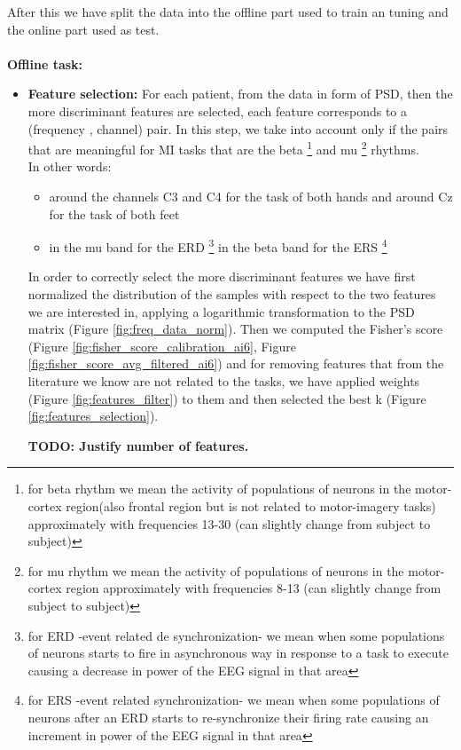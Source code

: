 After this we have split the data into the offline part used to train an tuning and the online part used as test.\\ \\
{\Large \textbf{Offline task:}}
\begin{itemize}
\item \textbf{Feature selection:}  For each patient, from the data in form of PSD, then the more discriminant features are selected, each feature corresponds to a (frequency , channel) pair. In this step, we take into account only if the pairs that are meaningful for MI tasks that are the beta
\footnote{for beta rhythm we mean the activity of populations of neurons in the motor-cortex region(also frontal region but is not related to motor-imagery tasks) approximately with frequencies 13-30 (can slightly change from subject to subject)}
 and mu
 \footnote{for mu rhythm we mean the activity of populations of neurons in the motor-cortex region approximately with frequencies 8-13 (can slightly change from subject to subject)}
rhythms.\\
In other words:
\begin{itemize}
\item around the channels C3 and C4 for the task of both hands and around Cz for the task of both feet
\item  in the mu band for the ERD
 \footnote{for ERD -event related de synchronization- we mean when some populations of neurons starts to fire in asynchronous way in response to a task to execute causing a decrease in power of the EEG signal in that area}
 in the beta band for the ERS 
 \footnote{for ERS -event related synchronization- we mean when some populations of neurons after an ERD starts to re-synchronize their firing rate causing an increment in power of the EEG signal in that area}
\end{itemize}
In order to correctly select the more discriminant features we have first normalized the distribution of the samples with respect to the two features we are interested in, applying a logarithmic transformation to the PSD matrix (Figure \ref{fig:freq_data_norm}).
Then we computed the Fisher's score (Figure \ref{fig:fisher_score_calibration_ai6}, Figure \ref{fig:fisher_score_avg_filtered_ai6}) and for removing features that from the literature we know are not related to the tasks, we have applied weights (Figure \ref{fig:features_filter}) to them and then selected the best k (Figure \ref{fig:features_selection}).

\textbf{TODO: Justify number of features.}


\end{itemize}
